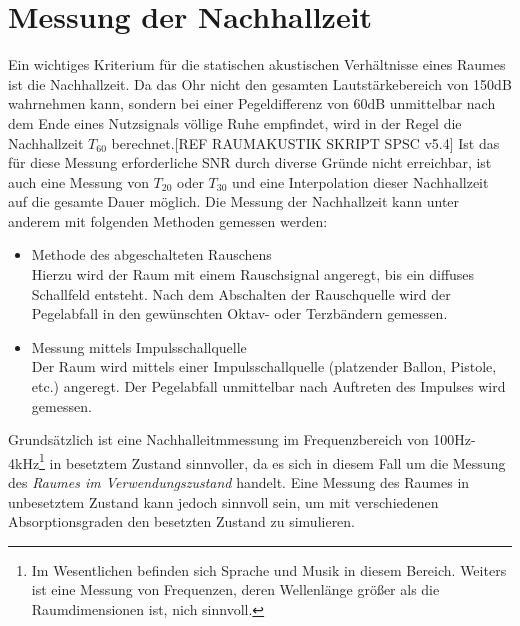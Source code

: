 \documentclass[11pt]{report}
\begin{document}


%

\newpage
\tableofcontents  

%




\listoffigures 


\pagestyle{headings}


\chapter{Messung der Nachhallzeit}
Ein wichtiges Kriterium für die statischen akustischen Verhältnisse eines Raumes ist die Nachhallzeit. Da das Ohr nicht den gesamten Lautstärkebereich von 150dB wahrnehmen kann, sondern bei einer Pegeldifferenz von 60dB unmittelbar nach dem Ende eines Nutzsignals völlige Ruhe empfindet, wird in der Regel die Nachhallzeit $T_{60}$ berechnet.[REF RAUMAKUSTIK SKRIPT SPSC v5.4]  Ist das für diese Messung erforderliche SNR durch diverse Gründe nicht erreichbar, ist auch eine Messung von $T_{20}$ oder $T_{30}$ und eine Interpolation dieser Nachhallzeit auf die gesamte Dauer möglich. Die Messung der Nachhallzeit kann unter anderem mit folgenden Methoden gemessen werden:
\begin{itemize}
\item Methode des abgeschalteten Rauschens\\
Hierzu wird der Raum mit einem Rauschsignal angeregt, bis ein diffuses Schallfeld entsteht. Nach dem Abschalten der Rauschquelle wird der Pegelabfall in den gewünschten Oktav- oder Terzbändern gemessen.
\item Messung mittels Impulsschallquelle\\
Der Raum wird mittels einer Impulsschallquelle (platzender Ballon, Pistole, etc.) angeregt. Der Pegelabfall unmittelbar nach Auftreten des Impulses wird gemessen.
\end{itemize}
Grundsätzlich ist eine Nachhalleitmmessung im Frequenzbereich von 100Hz-4kHz\footnote{Im Wesentlichen befinden sich Sprache und Musik in diesem Bereich. Weiters ist eine Messung von Frequenzen, deren Wellenlänge größer als die Raumdimensionen ist, nich sinnvoll.} in besetztem Zustand sinnvoller, da es sich in diesem Fall um die Messung des \textit{Raumes im Verwendungszustand} handelt. Eine Messung des Raumes in unbesetztem Zustand kann jedoch sinnvoll sein, um mit verschiedenen Absorptionsgraden den besetzten Zustand zu simulieren.
\end{document}
